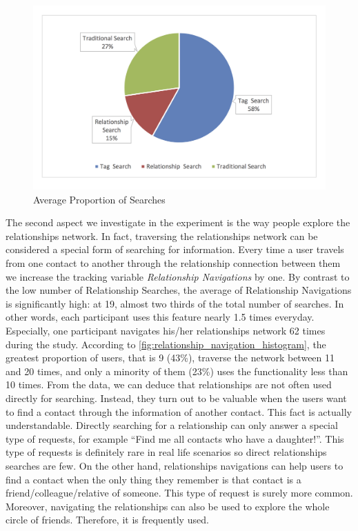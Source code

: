 \begin{figure}[!h]
\begin{centering}
\includegraphics[scale=0.68]{pics/search_percentage.png}
\caption{Average Proportion of Searches}\label{fig:search_percentage}
\end{centering}
\end{figure}

The second aspect we investigate in the experiment is the way people explore the relationships network. In fact, traversing the relationships network can be considered a special form of searching for information. Every time a user travels from one contact to another through the relationship connection between them we increase the tracking variable \textit{Relationship Navigations} by one. By contrast to the low number of Relationship Searches, the average of Relationship Navigations is significantly high: at 19, almost two thirds of the total number of searches. In other words, each participant uses this feature nearly 1.5 times everyday. Especially, one participant navigates his/her relationships network 62 times during the study. According to \autoref{fig:relationship_navigation_histogram}, the greatest proportion of users, that is 9 (43\%), traverse the network between 11 and 20 times, and only a minority of them (23\%) uses the functionality less than 10 times. From the data, we can deduce that relationships are not often used directly for searching. Instead, they turn out to be valuable when the users want to find a contact through the information of another contact. This fact is actually understandable. Directly searching for a relationship can only answer a special type of requests, for example ``Find me all contacts who have a daughter!''. This type of requests is definitely rare in real life scenarios so direct relationships searches are few. On the other hand, relationships navigations can help users to find a contact when the only thing they remember is that contact is a friend/colleague/relative of someone. This type of request is surely more common. Moreover, navigating the relationships can also be used to explore the whole circle of friends. Therefore, it is frequently used.

